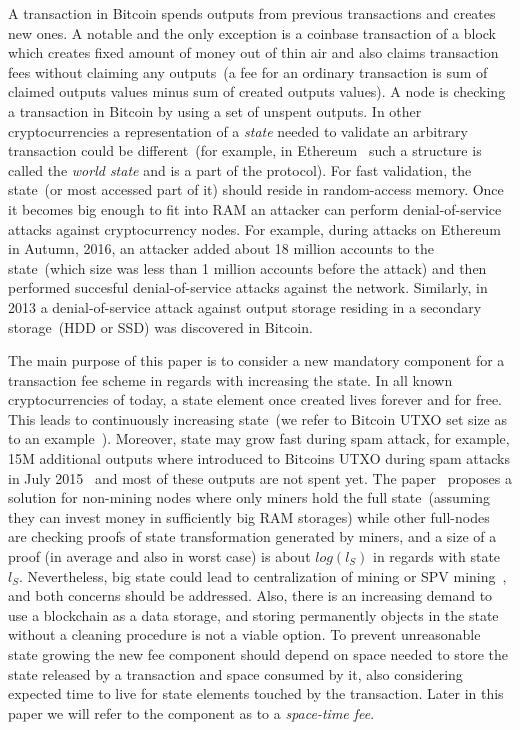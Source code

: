 \documentclass[]{article}   %
\newcommand{\authnote}[2]{\marginpar{\parbox{\marginparwidth}{\tiny %
  \textsf{#1 {\textcolor{blue}{notes: #2}}}}}%
  \textcolor{blue}{\textbf{\dag}}}
\newcommand{\authnote}[2]{
  \textsf{#1 \textcolor{blue}{: #2}}}
\newcommand{\authnote}[2]{}
\newcommand{\dnote}[1]{{\authnote{\textcolor{blue}{Dima notes}}{#1}}}
\begin{document}
A transaction in Bitcoin spends outputs from previous transactions and creates new ones. A notable and the only exception is a coinbase transaction of a block which creates fixed amount of money out of thin air and also claims transaction fees without claiming any outputs~(a fee for an ordinary transaction is sum of claimed outputs values minus sum of created outputs values). A node is checking a transaction in Bitcoin by using a set of unspent outputs. In other cryptocurrencies a representation of a \textit{state} needed to validate an arbitrary transaction could be different~(for example, in Ethereum~\cite{ethyp} such a structure is called the \textit{world state} and is a part of the protocol).  For fast validation, the state~(or most accessed part of it) should reside in random-access memory. Once it becomes big enough to fit into RAM an attacker can perform denial-of-service attacks against cryptocurrency nodes. For example, during attacks on Ethereum in Autumn, 2016, an attacker added about 18 million accounts to the state~(which size was less than 1 million accounts before the attack) and then performed succesful denial-of-service attacks against the network. Similarly, in 2013 a denial-of-service attack against output storage residing in a secondary storage~(HDD or SSD) was discovered in Bitcoin. 


The main purpose of this paper is to consider a new mandatory component for a transaction fee scheme in regards with increasing the state. In all known cryptocurrencies of today, a state element once created lives forever and for free. This leads to continuously increasing state~(we refer to Bitcoin UTXO set size as to an example~\cite{utxoChart}). Moreover, state may grow fast during spam attack, for example, 15M additional outputs where introduced to Bitcoins UTXO during spam attacks in July 2015~\cite{bitcoin2015flood} and most of these outputs are not spent yet. The paper~\cite{reyzin2016improving}\dnote{was it assumed?} proposes a solution for non-mining nodes where only miners hold the full state~(assuming they can invest money in sufficiently big RAM storages) while other full-nodes are checking proofs of state transformation generated by miners, and a size of a proof (in average and also in worst case) is about $log(l_S)$ in regards with state $l_S$. Nevertheless, big state could lead to centralization of mining or SPV mining~\cite{spvMining}, and both concerns should be addressed.
Also, there is an increasing demand to use a blockchain as a data storage, and storing permanently objects in the state without a cleaning procedure is not a viable option. To prevent unreasonable state growing the new fee component should depend on space needed to store the state released by a transaction and space consumed by it, also considering expected time to live for state elements touched by the transaction. Later in this paper we will refer to the component as to a \textit{space-time fee}.
\end{document}
